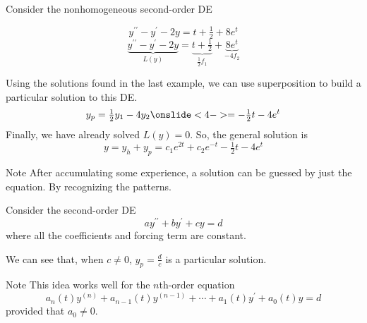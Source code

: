 \documentclass{beamer}
\begin{document}
\begin{frame}
\begin{example}
Consider the nonhomogeneous second-order DE

\vspace{-4mm}
\begin{overprint}
\begin{equation*}
y^{\prime\prime}-y^{\prime}-2y=t+\tfrac{1}{2}+8e^t
\end{equation*}
\begin{equation*}
\underbrace{y^{\prime\prime}-y^{\prime}-2y}_{L(y)}=\underbrace{t+\tfrac{1}{2}}_{\tfrac{1}{2}f_1}+\underbrace{8e^t}_{-4f_2}
\end{equation*}
\end{overprint}
Using the solutions found in the last example, we can use superposition to build a particular solution to this DE\@.
\begin{equation*}
y_p=\tfrac{1}{2}y_1-4y_2
\onslide<4->
=-\tfrac{1}{2}t-4e^t
\end{equation*}
Finally, we have already solved $L(y)=0$. So, the general solution is
\begin{equation*}
y=y_h+y_p=c_1e^{2t}+c_2e^{-t}-\tfrac{1}{2}t-4e^t
\end{equation*}
\end{example}
\begin{block}{Note}
After accumulating some experience, a solution can be guessed by just  the equation. By recognizing the patterns.
\end{block}
\end{frame}

\begin{frame}
\begin{example}
Consider the second-order DE 
\begin{equation*}
ay^{\prime\prime}+by^{\prime}+cy=d
\end{equation*}
where all the coefficients and forcing term are constant.\pause

\vspace{2mm}
We can see that, when $c\neq 0$, $y_p=\tfrac{d}{c}$ is a particular solution.
\end{example}\pause
\begin{block}{Note}
This idea works well for the $n$th-order equation
\begin{equation*}
a_n(t)y^{(n)}+a_{n-1}(t)y^{(n-1)}+\cdots+a_1(t)y^\prime+a_0(t)y=d
\end{equation*}
provided that $a_0\neq 0$.
\end{block}
\end{frame}
\end{document}
